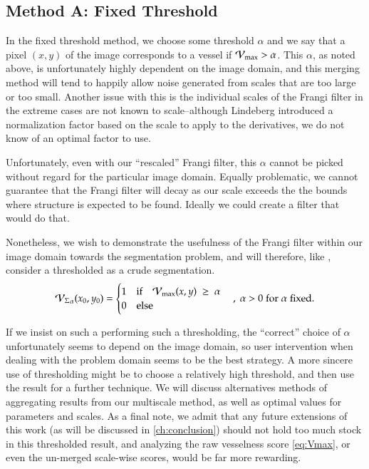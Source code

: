 \subsection{Method A: Fixed Threshold}

In the fixed threshold method, we choose some threshold $\alpha$ and we say that a pixel $(x,y)$ of the image corresponds to a vessel if
$\mathcal{V}_{\max} >  \alpha$. This $\alpha$, as noted above, is unfortunately highly dependent on the image domain, and this merging method will tend to happily allow noise generated from scales that are too large or too small.
 Another issue with this is the individual scales of the Frangi filter in the extreme cases are not known to scale--although Lindeberg introduced a normalization factor based on the scale to apply to the derivatives, we do not know of an optimal factor to use.

Unfortunately, even with our ``rescaled'' Frangi filter, this $\alpha$ cannot be picked without regard for the particular image domain. Equally problematic, we cannot guarantee that the Frangi filter will decay as our scale exceeds the the bounds where structure is expected to be found. Ideally we could create a filter that would do that.

 Nonetheless, we wish to demonstrate the usefulness of the Frangi filter within our image domain towards the segmentation problem, and will therefore, like \cite{huynh2013filter}, consider a thresholded \Vmax{} as a crude segmentation. 
\begin{equation}
{\ensuremath{\mathcal{V}_{\Sigma}}}_{\alpha}(x_0,y_0) = \begin{cases}
1 & \textrm{if}\quad \mathcal{V}_{\max}(x,y) \; \ge\;  \alpha \\
0 & \textrm{else}
\end{cases}  \quad , \; \alpha > 0
\; \textrm{for}\;\alpha\;\textrm{fixed}.
\end{equation}

If we insist on such a performing such a thresholding, the ``correct'' choice of $\alpha$ unfortunately seems to depend on the image domain, so user intervention when dealing with the problem domain seems to be the best strategy. A more sincere use of thresholding might be to choose a relatively high threshold, and then use the result for a further technique.
We will discuss alternatives methods of aggregating results from our multiscale method, as well as optimal values for parameters and scales. As a final note, we admit that any future extensions of this work (as will be discussed in \cref{ch:conclusion}) should not hold too much stock in this thresholded result, and analyzing the 
raw vesselness score \cref{eq:Vmax}, or even the un-merged scale-wise scores, would be far more rewarding.    
